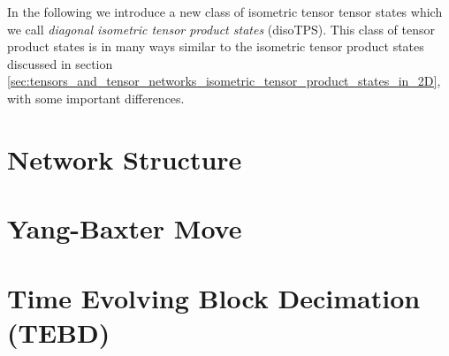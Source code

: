 In the following we introduce a new class of isometric tensor tensor states which we call \textit{diagonal isometric tensor product states} (disoTPS). This class of tensor product states is in many ways similar to the isometric tensor product states discussed in section \ref{sec:tensors_and_tensor_networks_isometric_tensor_product_states_in_2D}, with some important differences. 

\section{Network Structure}
\label{sec:disoTPS_network_structure}


\section{Yang-Baxter Move}
\label{sec:disoTPS_yang_baxter_move}


\section{Time Evolving Block Decimation (TEBD)}
\label{sec:disoTPS_TEBD}
